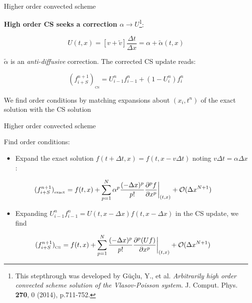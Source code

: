 \documentclass{beamer}
\begin{document}
\begin{frame}{Higher order convected scheme}

\textbf{High order CS seeks a correction $\alpha\rightarrow U$}\footnote{This stepthrough was developed by G\"{u}\c{c}lu, Y., et al. \emph{Arbitrarily high order convected scheme solution of the Vlasov-Poisson system}. J. Comput. Phys. \textbf{270}, 0 (2014), p.711-752.}:

$$U(t,x) = [v + \tilde{v}]\frac{\Delta t}{\Delta x} = \alpha + \tilde{\alpha}(t,x)$$

$\tilde{\alpha}$ is an \emph{anti-diffusive} correction. The corrected CS update reads:

$$(f_{i+S}^{n+1})_{_{\mathrm{CS}}} = U_{i-1}^{n} f_{i-1}^n + (1 - U_i^n)f_i^n$$

We find order conditions by matching expansions about $(x_i,t^n)$ of the exact solution with the CS solution
 
\end{frame}
 
 
\begin{frame}{Higher order convected scheme}

Find order conditions:

\begin{itemize}
\item Expand the exact solution $f(t+\Delta t,x) = f(t, x - v\Delta t)$ noting $v\Delta t = \alpha\Delta x$:

$$\hspace*{-9mm}(f_{i+S}^{n+1})_{_{\mathrm{exact}}} =  f(t,x) + \sum_{p = 1}^{N}\alpha^p \frac{(-\Delta x)^p}{p!}\frac{\partial^p f}{\partial x^p}\biggr|_{(t,x)} + \mathcal{O}(\Delta x^{N+1})$$

\item Expanding $U_{i-1}^n f_{i-1}^n  =  U(t,x - \Delta x) f(t,x - \Delta x)$ in the CS update, we find

$$\hspace*{-9mm}(f^{n+1}_{i+S})_{_{\mathrm{CS}}}  =   f(t,x) + \sum_{p = 1}^{N}\frac{(-\Delta x)^p}{p!}\frac{\partial^p(Uf)}{\partial x^p}\biggr|_{(t,x)} + \mathcal{O}(\Delta x^{N+1})$$

\end{itemize}

\end{frame}
 
\end{document}
